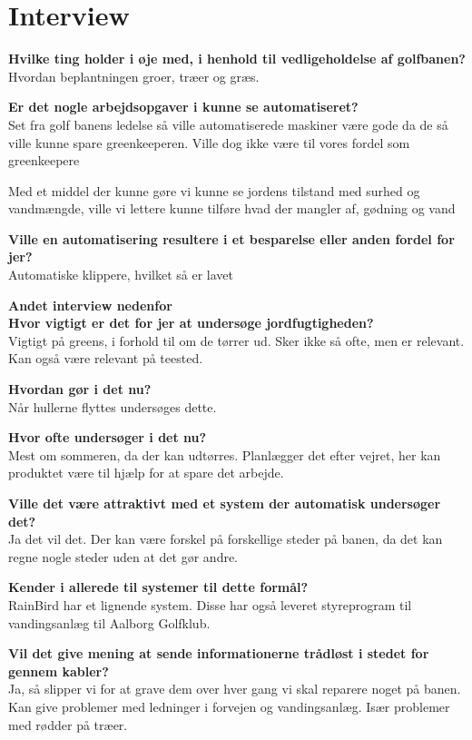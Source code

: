 \chapter{Interview}
\textbf{Hvilke ting holder i øje med, i henhold til vedligeholdelse af golfbanen?}\\
Hvordan beplantningen groer, træer og græs.

\textbf{Er det nogle arbejdsopgaver i kunne se automatiseret?}\\
Set fra golf banens ledelse så ville automatiserede maskiner være gode da de så ville kunne spare greenkeeperen.
Ville dog ikke være til vores fordel som greenkeepere

Med et middel der kunne gøre vi kunne se jordens tilstand med surhed og vandmængde, ville vi lettere kunne tilføre hvad der mangler af, gødning og vand

\textbf{Ville en automatisering resultere i et besparelse eller anden fordel for jer?}\\
Automatiske klippere, hvilket så er lavet 

\textbf{Andet interview nedenfor}\\

\textbf{Hvor vigtigt er det for jer at undersøge jordfugtigheden?}\\
Vigtigt på greens, i forhold til om de tørrer ud. Sker ikke så ofte, men er relevant.
Kan også være relevant på teested.

\textbf{Hvordan gør i det nu?}\\
Når hullerne flyttes undersøges dette.

\textbf{Hvor ofte undersøger i det nu?}\\
Mest om sommeren, da der kan udtørres. Planlægger det efter vejret, her kan produktet være til hjælp for at spare det arbejde.

\textbf{Ville det være attraktivt med et system der automatisk undersøger det?}\\
Ja det vil det. Der kan være forskel på forskellige steder på banen, da det kan regne nogle steder uden at det gør andre.

\textbf{Kender i allerede til systemer til dette formål?}\\
RainBird har et lignende system. Disse har også leveret styreprogram til vandingsanlæg til Aalborg Golfklub.

\textbf{Vil det give mening at sende informationerne trådløst i stedet for gennem kabler?}\\
Ja, så slipper vi for at grave dem over hver gang vi skal reparere noget på banen. Kan give problemer med ledninger i forvejen og vandingsanlæg. Især problemer med rødder på træer.

